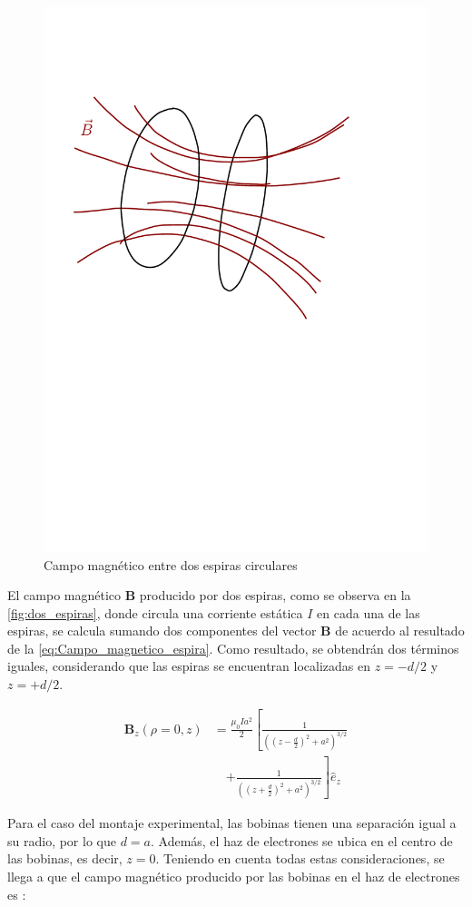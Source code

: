 \begin{figure}[H]
  \centering
  \includegraphics[width=0.6\linewidth]{./images/coils-field.pdf}
  \caption{Campo magnético entre dos espiras circulares}
  \label{fig:CM_dos_espiras}
\end{figure}

El campo magnético $\mathbf{B}$ producido por dos espiras, como se observa en la
\cref{fig:dos_espiras}, donde circula una corriente estática $I$ en cada una de
las espiras, se calcula sumando dos componentes del vector $\mathbf{B}$ de
acuerdo al resultado de la \cref{eq:Campo_magnetico_espira}.
Como resultado, se obtendrán dos términos iguales, considerando que las espiras
se encuentran localizadas en $z = -d/2$ y $z = +d/2$.

\begin{equation}
\begin{aligned}
  \mathbf{B}_{z}(\rho=0,z) &= \frac{\mu_{0} I a^{2}}{2} \left[ \frac{1}{\left((z-\frac{d}{2})^{2} + a^{2}\right)^{3/2}} \right.\\
                           &\quad \left.+ \frac{1}{\left((z+\frac{d}{2})^{2} + a^{2}\right)^{3/2}} \right] \hat{e}_{z}
  \label{Campo_magnetico_2espiras}
\end{aligned}
\end{equation}

Para el caso del montaje experimental, las bobinas tienen una separación igual a
su radio, por lo que \( d = a \).
Además, el haz de electrones se ubica en el centro de las bobinas, es decir,
\( z = 0 \). Teniendo en cuenta todas estas consideraciones, se llega a que el
campo magnético producido por las bobinas en el haz de electrones es
\cite{boix_practica_2}:


